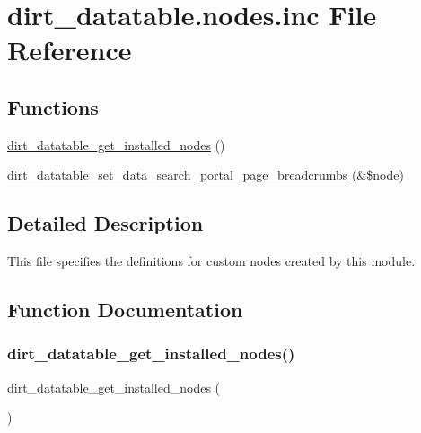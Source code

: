 \hypertarget{dirt__datatable_8nodes_8inc}{}\section{dirt\+\_\+datatable.\+nodes.\+inc File Reference}
\label{dirt__datatable_8nodes_8inc}
\subsection*{Functions}
\begin{DoxyCompactItemize}
\item 
\mbox{\hyperlink{dirt__datatable_8nodes_8inc_a999c227bd3c4fce331af1cb7632b9433}{dirt\+\_\+datatable\+\_\+get\+\_\+installed\+\_\+nodes}} ()
\item 
\mbox{\hyperlink{dirt__datatable_8nodes_8inc_a6ebe56f1ef58bb7c6f488a9b9250bf64}{dirt\+\_\+datatable\+\_\+set\+\_\+data\+\_\+search\+\_\+portal\+\_\+page\+\_\+breadcrumbs}} (\&\$node)
\end{DoxyCompactItemize}


\subsection{Detailed Description}
This file specifies the definitions for custom nodes created by this module. 

\subsection{Function Documentation}
\mbox{\label{dirt__datatable_8nodes_8inc_a999c227bd3c4fce331af1cb7632b9433}} 
\subsubsection{\texorpdfstring{dirt\+\_\+datatable\+\_\+get\+\_\+installed\+\_\+nodes()}{dirt\_datatable\_get\_installed\_nodes()}}
{\footnotesize\ttfamily dirt\+\_\+datatable\+\_\+get\+\_\+installed\+\_\+nodes (\begin{DoxyParamCaption}{ }\end{DoxyParamCaption})}

